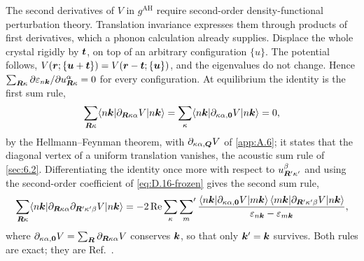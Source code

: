 The second derivatives of $V$ in $g^{\mathrm{AH}}$ require second-order density-functional perturbation theory. Translation invariance expresses them through products of first derivatives, which a phonon calculation already supplies. Displace the whole crystal rigidly by $\bm{t}$, on top of an arbitrary configuration $\{u\}$. The potential follows, $V(\bm{r};\{\bm{u} + \bm{t}\}) = V(\bm{r} - \bm{t};\{\bm{u}\})$, and the eigenvalues do not change. Hence $\sum_{\bm{R}\kappa}\partial\varepsilon_{n\bm{k}}/\partial u^\alpha_{\bm{R}\kappa} = 0$ for every configuration. At equilibrium the identity is the first sum rule,
\begin{equation}
  \sum_{\bm{R}\kappa}\langle n\bm{k}|\partial_{\bm{R}\kappa\alpha}V|n\bm{k}\rangle = \sum_\kappa\langle n\bm{k}|\partial_{\kappa\alpha,\bm{0}}V|n\bm{k}\rangle = 0 ,
  \label{eq:D.16-sr1}
\end{equation}
by the Hellmann--Feynman theorem, with $\partial_{\kappa\alpha,\bm{Q}}V$ of \cref{app:A.6}; it states that the diagonal vertex of a uniform translation vanishes, the acoustic sum rule of \cref{sec:6.2}. Differentiating the identity once more with respect to $u^\beta_{\bm{R}'\kappa'}$ and using the second-order coefficient of \cref{eq:D.16-frozen} gives the second sum rule,
\begin{equation}
  \sum_{\bm{R}\kappa}\langle n\bm{k}|\partial_{\bm{R}\kappa\alpha}\partial_{\bm{R}'\kappa'\beta}V|n\bm{k}\rangle
  = -2\operatorname{Re}\sum_\kappa{\sum_{m}}'\,\frac{\langle n\bm{k}|\partial_{\kappa\alpha,\bm{0}}V|m\bm{k}\rangle\,\langle m\bm{k}|\partial_{\bm{R}'\kappa'\beta}V|n\bm{k}\rangle}{\varepsilon_{n\bm{k}} - \varepsilon_{m\bm{k}}} ,
  \label{eq:D.16-sr2}
\end{equation}
where $\partial_{\kappa\alpha,\bm{0}}V = \sum_{\bm{R}}\partial_{\bm{R}\kappa\alpha}V$ conserves $\bm{k}$, so that only $\bm{k}' = \bm{k}$ survives. Both rules are exact; they are Ref.~\cite[Eqs.~(193) and~(194)]{giustino2017electron}.

